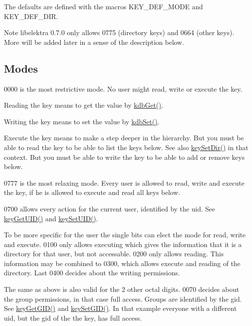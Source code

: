 The defaults are defined with the macros KEY\_\-DEF\_\-MODE and KEY\_\-DEF\_\-DIR.

\begin{DoxyNote}{Note}
libelektra 0.7.0 only allows 0775 (directory keys) and 0664 (other keys). More will be added later in a sense of the description below.
\end{DoxyNote}
\hypertarget{group__keymeta_mode}{}\subsection{Modes}\label{group__keymeta_mode}
0000 is the most restrictive mode. No user might read, write or execute the key.

Reading the key means to get the value by \hyperlink{group__kdb_ga28e385fd9cb7ccfe0b2f1ed2f62453a1}{kdbGet()}.

Writing the key means to set the value by \hyperlink{group__kdb_ga11436b058408f83d303ca5e996832bcf}{kdbSet()}.

Execute the key means to make a step deeper in the hierarchy. But you must be able to read the key to be able to list the keys below. See also \hyperlink{group__keymeta_gaae575bd86a628a15ee45baa860522e75}{keySetDir()} in that context. But you must be able to write the key to be able to add or remove keys below.

0777 is the most relaxing mode. Every user is allowed to read, write and execute the key, if he is allowed to execute and read all keys below.

0700 allows every action for the current user, identified by the uid. See \hyperlink{group__keymeta_gacaa5060e67b03f50ae49a3620c54bc46}{keyGetUID()} and \hyperlink{group__keymeta_gab5f284f5ecd261e0a290095f50ba1af7}{keySetUID()}.

To be more specific for the user the single bits can elect the mode for read, write and execute. 0100 only allows executing which gives the information that it is a directory for that user, but not accessable. 0200 only allows reading. This information may be combined to 0300, which allows execute and reading of the directory. Last 0400 decides about the writing permissions.

The same as above is also valid for the 2 other octal digits. 0070 decides about the group permissions, in that case full access. Groups are identified by the gid. See \hyperlink{group__keymeta_ga46a95e81d7d7f4e3eb59e60e5f3738c0}{keyGetGID()} and \hyperlink{group__keymeta_ga9e3d0fb3f7ba906e067727b9155d22e3}{keySetGID()}. In that example everyone with a different uid, but the gid of the the key, has full access.

